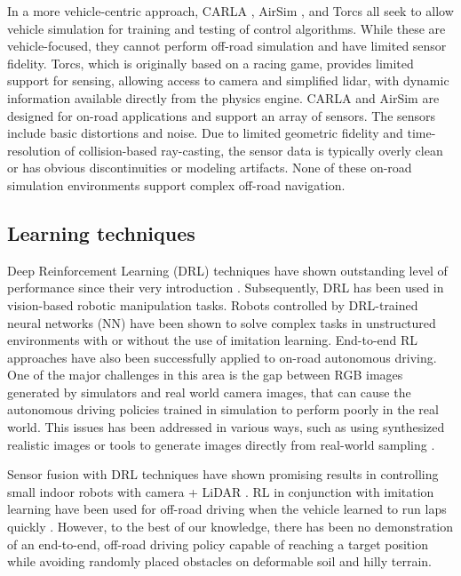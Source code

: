 In a more vehicle-centric approach, CARLA \cite{carlaAVsim2017}, AirSim \cite{shah2018airsim}, and Torcs \cite{torcsRacingSimulation2020} all seek to allow vehicle simulation for training and testing of control algorithms. While these are vehicle-focused, they cannot perform off-road simulation and have limited sensor fidelity. Torcs, which is originally based on a racing game, provides limited support for sensing, allowing access to camera and simplified lidar, with dynamic information available directly from the physics engine. CARLA and AirSim are designed for on-road applications and support an array of sensors. The sensors include basic distortions and noise. Due to limited geometric fidelity and time-resolution of collision-based ray-casting, the sensor data is typically overly clean or has obvious discontinuities or modeling artifacts. None of these on-road simulation environments support complex off-road navigation.


\subsection{Learning techniques}
\label{subsec:learningTechniques}

Deep Reinforcement Learning (DRL) techniques have shown outstanding level of performance since their very introduction \cite{Mnih13}. Subsequently, DRL has been used in vision-based robotic manipulation tasks. Robots controlled by DRL-trained neural networks (NN) have been shown to solve complex tasks in unstructured environments with \cite{zhu2018reinforcement} or without \cite{LevineFDA15} the use of imitation learning. 
End-to-end RL approaches have also been successfully applied to on-road autonomous driving. One of the major challenges in this area is the gap between RGB images generated by simulators and real world camera images, that can cause the autonomous driving policies trained in simulation to perform poorly in the real world. This issues has been addressed in various ways, such as using synthesized realistic images \cite{YurongALDriving17} or tools to generate images directly from real-world sampling \cite{Amini2020RLDriving}.

Sensor fusion with DRL techniques have shown promising results in controlling small indoor robots with camera + LiDAR \cite{BohezVCVSD17,PatelCKK2017}. RL in conjunction with imitation learning have been used for off-road driving when the vehicle learned to run laps quickly  \cite{Pan2017OffRoadAV}. However, to the best of our knowledge, there has been no demonstration of an end-to-end, off-road driving policy capable of reaching a target position while avoiding randomly placed obstacles on deformable soil and hilly terrain. 
